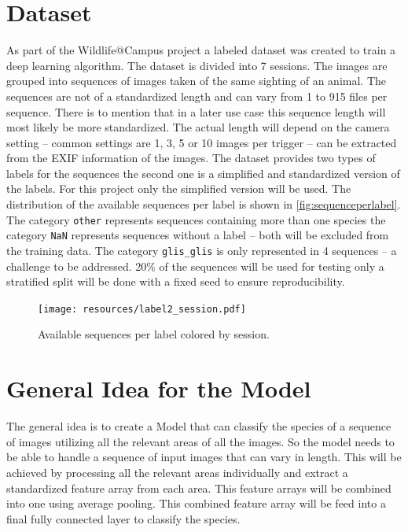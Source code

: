\documentclass{article}
\begin{document}
\section*{Dataset} %

As part of the Wildlife@Campus project a labeled dataset was created to train a deep learning algorithm.
The dataset is divided into 7 sessions. The images are grouped into sequences of images taken of the same sighting 
of an animal. The sequences are not of a standardized length and can vary from 1 to 915 files per sequence.
There is to mention that in a later use case this sequence length will most likely be more standardized.
The actual length will depend on the camera setting -- common settings are 1, 3, 5 or 10 images per trigger -- 
can be extracted from the EXIF information of the images. The dataset provides two types of labels for the sequences 
the second one is a simplified and standardized version of the labels. For this project only the simplified version 
will be used. The distribution of the available sequences per label is shown in \autoref{fig:sequenceperlabel}.
The category \texttt{other} represents sequences containing more than one species the category \texttt{NaN} 
represents sequences without a label -- both will be excluded from the training data. 
The category \texttt{glis\_glis} is only represented in 4 sequences -- a challenge to be addressed.
20\% of the sequences will be used for testing only a stratified split will be done with a fixed seed to ensure
reproducibility.

\begin{figure}[ht]
  \centering
  \texttt{[image: resources/label2\_session.pdf]}
  \caption{Available sequences per label colored by session.}
  \label{fig:sequenceperlabel}
\end{figure}

\section*{General Idea for the Model} %

The general idea is to create a Model that can classify the species of a sequence of images utilizing all the relevant 
areas of all the images. So the model needs to be able to handle a sequence of input images that can vary in length. 
This will be achieved by processing all the relevant areas individually and extract a standardized feature array from 
each area. This feature arrays will be combined into one using average pooling. This combined feature array
will be feed into a final fully connected layer to classify the species.
\end{document}
